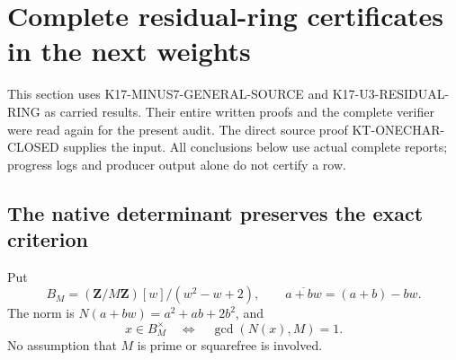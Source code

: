 \section{Complete residual-ring certificates in the next weights}
\label{sec:kt-higher4}

This section uses K17-MINUS7-GENERAL-SOURCE and
K17-U3-RESIDUAL-RING as carried results.  Their entire written
proofs and the complete verifier were read again for the present
audit.  The direct source proof KT-ONECHAR-CLOSED supplies the
 input.  All conclusions below use actual complete
reports; progress logs and producer output alone do not certify a row.

\subsection{The native determinant preserves the exact criterion}

Put
\[
 B_M=(\mathbf Z/M\mathbf Z)[w]/(w^2-w+2),\qquad
 \overline{a+bw}=(a+b)-bw.
\]
The norm is $N(a+bw)=a^2+ab+2b^2$, and
\[
 x\in B_M^\times\quad\Longleftrightarrow\quad
                  \gcd(N(x),M)=1.                 \tag{KT-H.1}
\]
No assumption that $M$ is prime or squarefree is involved.

